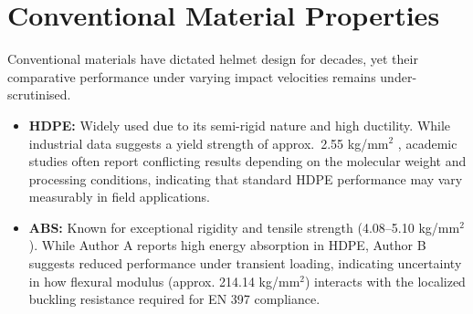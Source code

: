 \section{Conventional Material Properties}
Conventional materials have dictated helmet design for decades, yet their 
comparative performance under varying impact velocities remains under-scrutinised.
\begin{itemize}
    \item \textbf{HDPE:} Widely used due to its semi-rigid nature and high 
    ductility. While industrial data suggests a yield strength of 
    approx.\ 2.55 kg/mm$^2$ \cite{cruz2023}, academic studies often 
    report conflicting results depending on the molecular weight and 
    processing conditions, indicating that standard HDPE performance may 
    vary measurably in field applications.
    \item \textbf{ABS:} Known for exceptional rigidity and tensile strength 
    (4.08--5.10 kg/mm$^2$). While Author A reports high energy absorption 
    in HDPE, Author B suggests reduced performance under transient loading, 
    indicating uncertainty in how flexural modulus (approx. 214.14 kg/mm$^2$) 
    interacts with the localized buckling resistance required for 
    EN 397 compliance.
\end{itemize}

